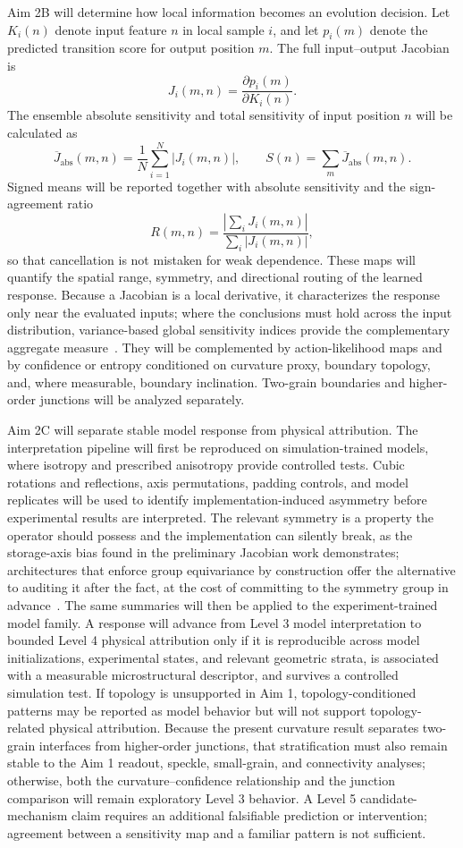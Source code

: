 \documentclass[proposalMode]{ufdissertation}
\begin{document}
Aim 2B will determine how local information becomes an evolution decision. Let \(K_i(n)\) denote input feature \(n\) in local sample \(i\), and let \(p_i(m)\) denote the predicted transition score for output position \(m\). The full input--output Jacobian is
\[
J_i(m,n)=\frac{\partial p_i(m)}{\partial K_i(n)}.
\]
The ensemble absolute sensitivity and total sensitivity of input position \(n\) will be calculated as
\[
\overline{J}_{\mathrm{abs}}(m,n)=\frac{1}{N}\sum_{i=1}^{N}\left|J_i(m,n)\right|,
\qquad
S(n)=\sum_m\overline{J}_{\mathrm{abs}}(m,n).
\]
Signed means will be reported together with absolute sensitivity and the sign-agreement ratio
\[
R(m,n)=
\frac{\left|\sum_i J_i(m,n)\right|}
{\sum_i\left|J_i(m,n)\right|},
\]
so that cancellation is not mistaken for weak dependence. These maps will quantify the spatial range, symmetry, and directional routing of the learned response. Because a Jacobian is a local derivative, it characterizes the response only near the evaluated inputs; where the conclusions must hold across the input distribution, variance-based global sensitivity indices provide the complementary aggregate measure~\cite{sobol2001indices}. They will be complemented by action-likelihood maps and by confidence or entropy conditioned on curvature proxy, boundary topology, and, where measurable, boundary inclination. Two-grain boundaries and higher-order junctions will be analyzed separately.

Aim 2C will separate stable model response from physical attribution. The interpretation pipeline will first be reproduced on simulation-trained models, where isotropy and prescribed anisotropy provide controlled tests. Cubic rotations and reflections, axis permutations, padding controls, and model replicates will be used to identify implementation-induced asymmetry before experimental results are interpreted. The relevant symmetry is a property the operator should possess and the implementation can silently break, as the storage-axis bias found in the preliminary Jacobian work demonstrates; architectures that enforce group equivariance by construction offer the alternative to auditing it after the fact, at the cost of committing to the symmetry group in advance~\cite{cohen2016equivariant,weiler2019steerable}. The same summaries will then be applied to the experiment-trained model family. A response will advance from Level 3 model interpretation to bounded Level 4 physical attribution only if it is reproducible across model initializations, experimental states, and relevant geometric strata, is associated with a measurable microstructural descriptor, and survives a controlled simulation test. If topology is unsupported in Aim 1, topology-conditioned patterns may be reported as model behavior but will not support topology-related physical attribution. Because the present curvature result separates two-grain interfaces from higher-order junctions, that stratification must also remain stable to the Aim 1 readout, speckle, small-grain, and connectivity analyses; otherwise, both the curvature--confidence relationship and the junction comparison will remain exploratory Level 3 behavior. A Level 5 candidate-mechanism claim requires an additional falsifiable prediction or intervention; agreement between a sensitivity map and a familiar pattern is not sufficient.
\end{document}
